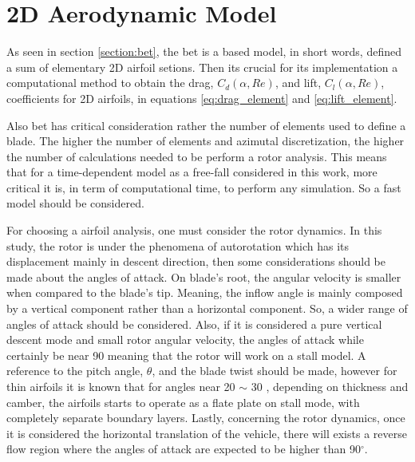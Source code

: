 
\section{2D Aerodynamic Model}
\label{section:aero_model}

As seen in section \ref{section:bet}, the \gls{bet} is a based model, in short words, defined a sum of elementary 2D airfoil setions. Then its crucial for its implementation a computational method to obtain the drag, $C_d (\alpha, Re) $, and  lift, $C_l (\alpha, Re)$, coefficients for 2D airfoils, in equations \ref{eq:drag_element} and \ref{eq:lift_element}.

Also \gls{bet} has critical consideration rather the number of elements used to define a blade. The higher the number of elements and azimutal discretization, the higher the number of calculations needed to be perform a rotor analysis. This means that for a time-dependent model as a free-fall considered in this work, more critical it is, in term of computational time, to perform any simulation. So a fast model should be considered.

For choosing a airfoil analysis, one must consider the rotor dynamics. In this study, the rotor is under the phenomena of autorotation which has its displacement mainly in descent direction, then some considerations should be made about the angles of attack. On blade's root, the angular velocity is smaller when compared to the blade's tip. Meaning, the inflow angle is mainly composed by a vertical component rather than a horizontal component. So, a wider range of angles of attack should be considered. Also, if it is considered a pure vertical descent mode and small rotor angular velocity, the angles of attack while certainly be near 90 \unit{\deg} meaning that the rotor will work on a stall model. A reference to the pitch angle, $\theta$, and the blade twist should be made, however for thin airfoils it is known that for angles near 20 $\sim$ 30 \unit{\deg}, depending on thickness and camber, the airfoils starts to operate as a flate plate on stall mode, with completely separate boundary layers. Lastly, concerning the rotor dynamics, once it is considered the horizontal translation of the vehicle, there will exists a reverse flow region where the angles of attack are expected to be higher than 90$^{\circ}$.

